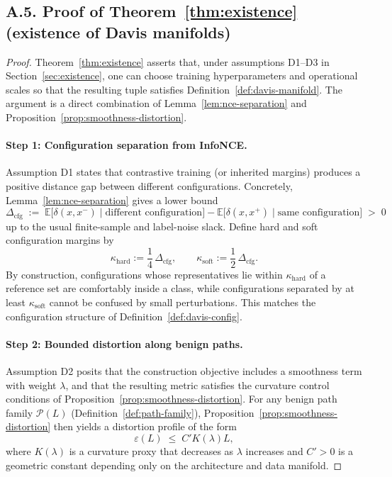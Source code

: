 \documentclass[11pt]{article}
\begin{document}
\medskip

\subsection*{A.5. Proof of Theorem~\ref{thm:existence} (existence of Davis manifolds)}

\begin{proof}
Theorem~\ref{thm:existence} asserts that, under assumptions D1–D3 in Section~\ref{sec:existence},
one can choose training hyperparameters and operational scales so that the resulting tuple satisfies
Definition~\ref{def:davis-manifold}.  The argument is a direct combination of
Lemma~\ref{lem:nce-separation} and Proposition~\ref{prop:smoothness-distortion}.

\paragraph{Step 1: Configuration separation from InfoNCE.}
Assumption D1 states that contrastive training (or inherited margins) produces a positive
distance gap between different configurations.  Concretely, Lemma~\ref{lem:nce-separation}
gives a lower bound
\[
\Delta_{\mathrm{cfg}}
\;:=\;
\mathbb{E}\bigl[\delta(x,x^{-})\mid \text{different configuration}\bigr]
-
\mathbb{E}\bigl[\delta(x,x^{+})\mid \text{same configuration}\bigr]
\;>\; 0
\]
up to the usual finite-sample and label-noise slack.  Define hard and soft configuration margins by
\[
\kappa_{\mathrm{hard}} := \frac{1}{4}\,\Delta_{\mathrm{cfg}},
\qquad
\kappa_{\mathrm{soft}} := \frac{1}{2}\,\Delta_{\mathrm{cfg}}.
\]
By construction, configurations whose representatives lie within $\kappa_{\mathrm{hard}}$ of a reference
set are comfortably inside a class, while configurations separated by at least $\kappa_{\mathrm{soft}}$
cannot be confused by small perturbations.  This matches the configuration structure of
Definition~\ref{def:davis-config}.

\paragraph{Step 2: Bounded distortion along benign paths.}
Assumption D2 posits that the construction objective includes a smoothness term with weight
$\lambda$, and that the resulting metric satisfies the curvature control conditions of
Proposition~\ref{prop:smoothness-distortion}.  For any benign path family $\mathcal{P}(L)$
(Definition~\ref{def:path-family}), Proposition~\ref{prop:smoothness-distortion} then yields a
distortion profile of the form
\[
\varepsilon(L) \;\le\; C' K(\lambda) L,
\]
where $K(\lambda)$ is a curvature proxy that decreases as $\lambda$ increases and $C'>0$ is a
geometric constant depending only on the architecture and data manifold.


\end{proof}
\end{document}
